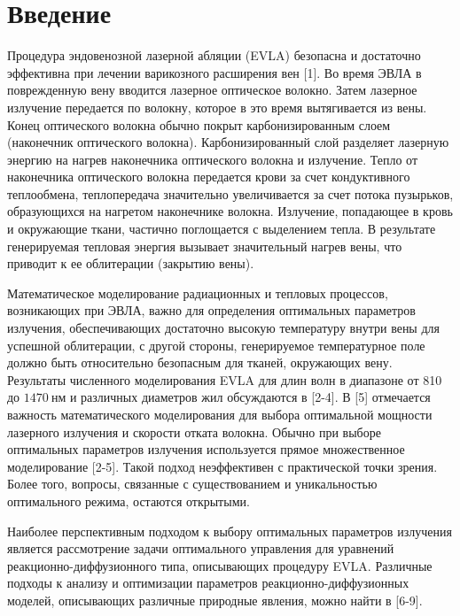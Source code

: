\section{Введение}
Процедура эндовенозной лазерной абляции (EVLA) безопасна и достаточно
эффективна при лечении варикозного расширения вен [1].
Во время ЭВЛА в поврежденную вену вводится лазерное оптическое волокно.
Затем лазерное излучение передается по волокну, которое в это время вытягивается из вены.
Конец оптического волокна обычно покрыт карбонизированным слоем (наконечник оптического волокна).
Карбонизированный слой разделяет лазерную энергию на нагрев наконечника оптического волокна и излучение.
Тепло от наконечника оптического волокна передается крови за счет кондуктивного теплообмена,
теплопередача значительно увеличивается за счет потока пузырьков,
образующихся на нагретом наконечнике волокна.
Излучение, попадающее в кровь и окружающие ткани, частично поглощается с выделением тепла.
В результате генерируемая тепловая энергия вызывает значительный нагрев вены,
что приводит к ее облитерации (закрытию вены).



Математическое моделирование радиационных и тепловых процессов, возникающих при ЭВЛА,
важно для определения оптимальных параметров излучения, обеспечивающих достаточно
высокую температуру внутри вены для успешной облитерации, с другой стороны,
генерируемое температурное поле должно быть относительно безопасным для тканей, окружающих вену.
Результаты численного моделирования EVLA для длин волн в диапазоне от
810 до $1470 \mathrm{~нм}$ и различных диаметров жил обсуждаются в [2-4].
В [5] отмечается важность математического моделирования для выбора оптимальной
мощности лазерного излучения и скорости отката волокна.
Обычно при выборе оптимальных параметров излучения
используется прямое множественное моделирование [2-5].
Такой подход неэффективен с практической точки зрения.
Более того, вопросы, связанные с существованием и
уникальностью оптимального режима, остаются открытыми.



Наиболее перспективным подходом к выбору оптимальных параметров излучения является
рассмотрение задачи оптимального управления для уравнений
реакционно-диффузионного типа, описывающих процедуру EVLA.
Различные подходы к анализу и оптимизации параметров реакционно-диффузионных моделей,
описывающих различные природные явления, можно найти в [6-9].

